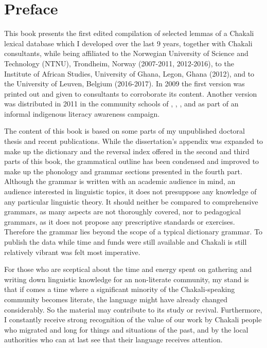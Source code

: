 \chapter*{Preface} 


This book presents the first edited compilation of selected lemmas of a Chakali lexical database which  I developed over the last 9 years, together with Chakali consultants, while being affiliated to the 
Norwegian University of Science and Technology (NTNU), 
Trondheim, Norway (2007-2011, 2012-2016),  to the 
Institute of African Studies, University of Ghana, Legon, Ghana (2012), and to the 
University of Leuven, Belgium  (2016-2017).   
In 2009 the first version  was printed out  and given to consultants to corroborate its content. Another version was distributed in 2011 in the community schools of , , ,  and   as part of  an informal indigenous literacy awareness campaign. 

The content of this book is based on some parts of my unpublished doctoral  thesis  \citep{brin11} and recent publications. While the dissertation's  appendix was expanded to make up the dictionary and the  reversal index offered in the second and third parts of this book, the grammatical outline has been condensed and improved to make up the phonology and grammar sections presented in the fourth part.  Although the grammar is written with an academic audience in mind, an audience interested in   linguistic topics, it does not presuppose any knowledge of any particular linguistic theory.  It should neither be compared to comprehensive grammars,  as many aspects are not thoroughly covered,  nor to  pedagogical grammars, as it does not propose any prescriptive standards or exercises. Therefore the grammar lies beyond the scope of a typical dictionary grammar. To  publish the data  while time and funds were still available and Chakali is still relatively vibrant was felt most  imperative.

For those who are sceptical about the time and energy spent on gathering and writing down linguistic  knowledge for an non-literate community, my stand is that if comes a  time where a significant minority of the Chakali-speaking community becomes literate, the language might have already changed considerably.  So the material may contribute to its study or revival.  Furthermore,   I constantly receive strong recognition of the value of our work by Chakali people who migrated and long for things and situations of the past, and by the local authorities who can at last see that their language  receives attention.

